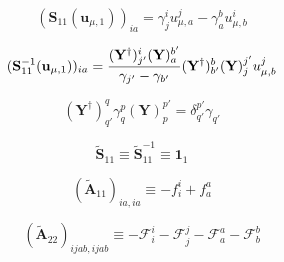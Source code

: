 \begin{subappendices}
    \begin{equation}
        (\mathbf{S}_{11}(\mathbf{u}_{\mu,1}))_{ia}
        =
        \gamma^i_j
        u_{\mu,a}^j
        -
        \gamma^b_a
        u_{\mu,b}^i
    \end{equation}

    \begin{equation}
        (\mathbf{S}_{11}^{-1}(\mathbf{u}_{\mu,1}))_{ia}
        =
        \frac{%
            (\mathbf{Y}^\dagger)_{j'}^i
            (\mathbf{Y})_a^{b'}
        }{%
            \gamma_{j'}-\gamma_{b'}
        }
        (\mathbf{Y}^\dagger)_{b'}^b
        (\mathbf{Y})_j^{j'}
        u_{\mu,b}^j
    \end{equation}

    \begin{equation}
        (\mathbf{Y}^\dagger)_{q'}^q
        \gamma_q^p
        (\mathbf{Y})_p^{p'}
        =
        \delta_{q'}^{p'}
        \gamma_{q'}
    \end{equation}

    \begin{equation}
        \tilde{\mathbf{S}}_{11}
        \equiv
        \tilde{\mathbf{S}}_{11}^{-1}
        \equiv
        \mathbf{1}_1
    \end{equation}

    \begin{equation}
        (\tilde{\mathbf{A}}_{11})_{ia,ia}
        \equiv
        -
        f_i^i
        +
        f_a^a
    \end{equation}

    \begin{equation}
        (\tilde{\mathbf{A}}_{22})_{ijab,ijab}
        \equiv
        -
        \mathcal{F}_i^i
        -
        \mathcal{F}_j^j
        -
        \mathcal{F}_a^a
        -
        \mathcal{F}_b^b
    \end{equation}

\end{subappendices}
